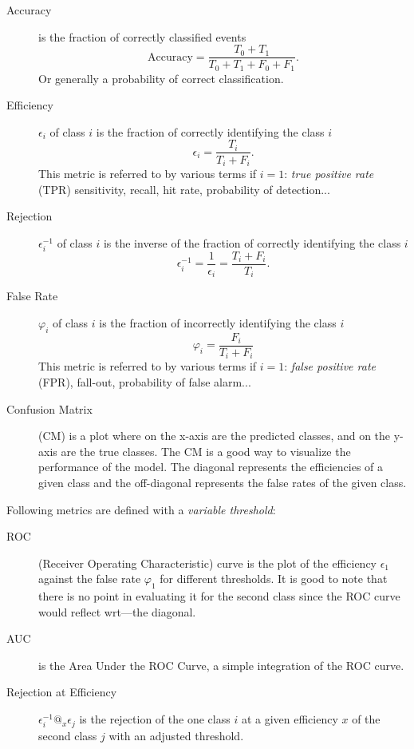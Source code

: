 \begin{description}
    \item[Accuracy] is the fraction of correctly classified events
    \begin{equation}
        \label{eq:accuracy}
        \text{Accuracy} = \frac{T_0 + T_1}{T_0 + T_1 + F_0 + F_1}.
    \end{equation}
    Or generally a probability of correct classification.
    \item[Efficiency] $\epsilon_i$ of class $i$ is the fraction of correctly identifying the class $i$ 
    \begin{equation}
        \label{eq:efficiency}
        \epsilon_i = \frac{T_i}{T_i + F_i}.
    \end{equation}
    This metric is referred to by various terms if $i = 1$: \emph{true positive rate} (TPR) sensitivity, recall, hit rate, probability of detection...
    \item[Rejection] $\epsilon^{-1}_i$ of class $i$ is the inverse of the fraction of correctly identifying the class $i$ 
    \begin{equation}
        \label{eq:rejection}
        \epsilon^{-1}_i = \frac{1}{\epsilon_i} = \frac{T_i + F_i}{T_i}.
    \end{equation}
    \item[False Rate] $\varphi_i$ of class $i$ is the fraction of incorrectly identifying the class $i$ 
    \begin{equation}
        \label{eq:false_rate}
        \varphi_i = \frac{F_i}{T_i+ F_i}
    \end{equation}
    This metric is referred to by various terms if $i = 1$: \emph{false positive rate} (FPR), fall-out, probability of false alarm...
    \item[Confusion Matrix] (CM) is a plot where on the x-axis are the predicted classes, and on the y-axis are the true classes. 
    The CM is a good way to visualize the performance of the model. 
    The diagonal represents the efficiencies of a given class and the off-diagonal represents the false rates of the given class.
\end{description}

Following metrics are defined with a \emph{variable threshold}:
\begin{description}
    \item [ROC] (Receiver Operating Characteristic) curve is the plot of the efficiency $\epsilon_1$ against the false rate $\varphi_1$ for different thresholds. 
    It is good to note that there is no point in evaluating it for the second class since the ROC curve would reflect wrt—the diagonal. 
    \item[AUC] is the Area Under the ROC Curve, a simple integration of the ROC curve.
    \item[Rejection at Efficiency] $\epsilon^{-1}_i @_x \epsilon_j$ is the rejection of the one class $i$ at a given efficiency $x$ of the second class $j$ with an adjusted threshold.
\end{description}


